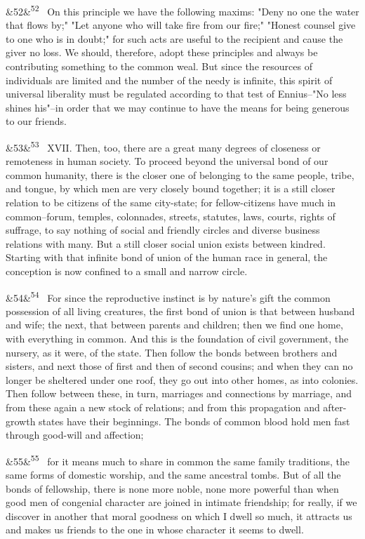 \documentclass[12pt]{article}
\newcommand{\para}[1][]{\par\noindent\ifx&#1&\else\textsuperscript{\footnotesize #1}~\fi}
\begin{document}
\para[52] On this principle we have the following maxims: "Deny no one the water that flows by;" "Let anyone who will take fire from our fire;" "Honest counsel give to one who is in doubt;" for such acts are useful to the recipient and cause the giver no loss. We should, therefore, adopt these principles and always be contributing something to the common weal. But since the resources of individuals are limited and the number of the needy is infinite, this spirit of universal liberality must be regulated according to that test of Ennius--"No less shines his"--in order that we may continue to have the means for being generous to our friends.

\para[53] XVII. Then, too, there are a great many degrees of closeness or remoteness in human society. To proceed beyond the universal bond of our common humanity, there is the closer one of belonging to the same people, tribe, and tongue, by which men are very closely bound together; it is a still closer relation to be citizens of the same city-state; for fellow-citizens have much in common--forum, temples, colonnades, streets, statutes, laws, courts, rights of suffrage, to say nothing of social and friendly circles and diverse business relations with many. But a still closer social union exists between kindred. Starting with that infinite bond of union of the human race in general, the conception is now confined to a small and narrow circle.

\para[54] For since the reproductive instinct is by nature's gift the common possession of all living creatures, the first bond of union is that between husband and wife; the next, that between parents and children; then we find one home, with everything in common. And this is the foundation of civil government, the nursery, as it were, of the state. Then follow the bonds between brothers and sisters, and next those of first and then of second cousins; and when they can no longer be sheltered under one roof, they go out into other homes, as into colonies. Then follow between these, in turn, marriages and connections by marriage, and from these again a new stock of relations; and from this propagation and after-growth states have their beginnings. The bonds of common blood hold men fast through good-will and affection;

\para[55] for it means much to share in common the same family traditions, the same forms of domestic worship, and the same ancestral tombs. But of all the bonds of fellowship, there is none more noble, none more powerful than when good men of congenial character are joined in intimate friendship; for really, if we discover in another that moral goodness on which I dwell so much, it attracts us and makes us friends to the one in whose character it seems to dwell.
\end{document}
